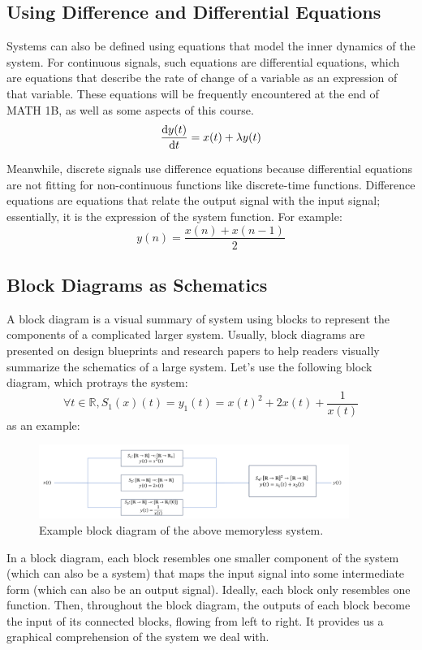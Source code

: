 \subsection{Using Difference and Differential Equations}
Systems can also be defined using equations that model the inner dynamics of the system.
For continuous signals, such equations are differential equations, which are equations that describe the rate of change of a variable as an expression of that variable.
These equations will be frequently encountered at the end of MATH 1B, as well as some aspects of this course.
\[
    \dv{y(t)}{t} = x(t) + \lambda y(t)
\]

Meanwhile, discrete signals use difference equations because differential equations are not fitting for non-continuous functions like discrete-time functions.
Difference equations are equations that relate the output signal with the input signal; essentially, it is the expression of the system function.
For example:
\[
    y(n) = \frac{x(n) + x(n - 1)}{2}
\]

\subsection{Block Diagrams as Schematics}
A block diagram is a visual summary of system using blocks to represent the components of a complicated larger system.
Usually, block diagrams are presented on design blueprints and research papers to help readers visually summarize the schematics of a large system.
Let's use the following block diagram, which protrays the system:
\[
    \forall t \in \mathbb{R}, S_1(x)(t) = y_1(t) = x(t)^2 + 2x(t) + \frac{1}{x(t)}
\]
as an example:

\begin{center}
    \begin{figure}[h]
        \centering
        \includegraphics[width=0.9\textwidth]{figs/ln06/example_block_diagram.png}
        \caption{Example block diagram of the above memoryless system.}
    \end{figure}
\end{center}

In a block diagram, each block resembles one smaller component of the system (which can also be a system) that maps the input signal into some intermediate form (which can also be an output signal).
Ideally, each block only resembles one function.
Then, throughout the block diagram, the outputs of each block become the input of its connected blocks, flowing from left to right.
It provides us a graphical comprehension of the system we deal with.

